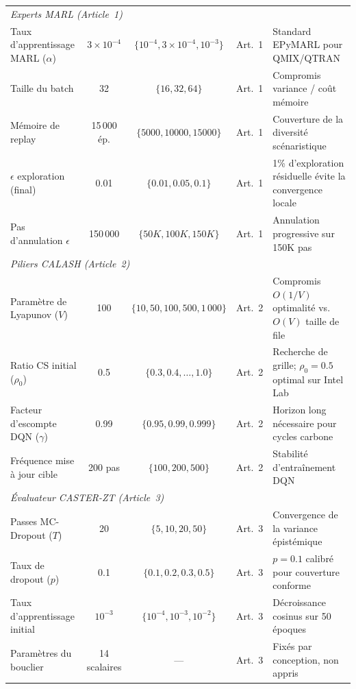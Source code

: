 \begin{table}[htbp]
{\begin{tabular}{p{3.5cm}ccp{1.2cm}p{5.5cm}}
\midrule
\multicolumn{5}{l}{\textit{Experts MARL (Article~1)}} \\
\addlinespace
Taux d'apprentissage MARL ($\alpha$) & $3 \times 10^{-4}$ & $\{10^{-4}, 3 \times 10^{-4}, 10^{-3}\}$ & Art.~1 & Standard EPyMARL pour QMIX/QTRAN \\
Taille du batch & 32 & $\{16, 32, 64\}$ & Art.~1 & Compromis variance / coût mémoire \\
Mémoire de replay & 15\,000 ép. & $\{5000, 10000, 15000\}$ & Art.~1 & Couverture de la diversité scénaristique \\
$\epsilon$ exploration (final) & 0.01 & $\{0.01, 0.05, 0.1\}$ & Art.~1 & 1\% d'exploration résiduelle évite la convergence locale \\
Pas d'annulation $\epsilon$ & 150\,000 & $\{50K, 100K, 150K\}$ & Art.~1 & Annulation progressive sur 150K pas \\
\midrule
\multicolumn{5}{l}{\textit{Piliers CALASH (Article~2)}} \\
\addlinespace
Paramètre de Lyapunov ($V$) & 100 & $\{10, 50, 100, 500, 1\,000\}$ & Art.~2 & Compromis $O(1/V)$ optimalité vs.\ $O(V)$ taille de file \cite{neely2010lyapunov} \\
Ratio CS initial ($\rho_0$) & 0.5 & $\{0.3, 0.4, \ldots, 1.0\}$ & Art.~2 & Recherche de grille; $\rho_0 = 0.5$ optimal sur Intel Lab \\
Facteur d'escompte DQN ($\gamma$) & 0.99 & $\{0.95, 0.99, 0.999\}$ & Art.~2 & Horizon long nécessaire pour cycles carbone \\
Fréquence mise à jour cible & 200 pas & $\{100, 200, 500\}$ & Art.~2 & Stabilité d'entraînement DQN \\
\midrule
\multicolumn{5}{l}{\textit{Évaluateur CASTER-ZT (Article~3)}} \\
\addlinespace
Passes MC-Dropout ($T$) & 20 & $\{5, 10, 20, 50\}$ & Art.~3 & Convergence de la variance épistémique \\
Taux de dropout ($p$) & 0.1 & $\{0.1, 0.2, 0.3, 0.5\}$ & Art.~3 & $p = 0.1$ calibré pour couverture conforme \\
Taux d'apprentissage initial & $10^{-3}$ & $\{10^{-4}, 10^{-3}, 10^{-2}\}$ & Art.~3 & Décroissance cosinus sur 50 époques \\
Paramètres du bouclier & 14 scalaires & --- & Art.~3 & Fixés par conception, non appris \\
\bottomrule
\end{tabular}%
}
\end{table}

